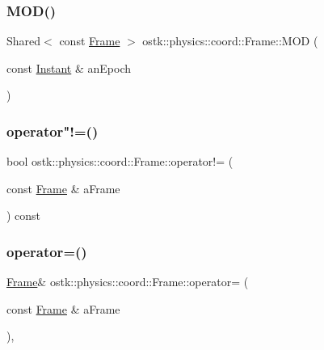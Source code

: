 \mbox{\label{classostk_1_1physics_1_1coord_1_1_frame_a3d0822a703af130adbc1f93dfd1faad9}} 
\subsubsection{\texorpdfstring{M\+O\+D()}{MOD()}}
{\footnotesize\ttfamily Shared$<$ const \hyperlink{classostk_1_1physics_1_1coord_1_1_frame}{Frame} $>$ ostk\+::physics\+::coord\+::\+Frame\+::\+M\+OD (\begin{DoxyParamCaption}\item[{const \hyperlink{classostk_1_1physics_1_1time_1_1_instant}{Instant} \&}]{an\+Epoch }\end{DoxyParamCaption})\hspace{0.3cm}{\ttfamily [static]}}

\mbox{\label{classostk_1_1physics_1_1coord_1_1_frame_a12a5cb341c34a404f220b0940a5dff79}} 
\subsubsection{\texorpdfstring{operator"!=()}{operator!=()}}
{\footnotesize\ttfamily bool ostk\+::physics\+::coord\+::\+Frame\+::operator!= (\begin{DoxyParamCaption}\item[{const \hyperlink{classostk_1_1physics_1_1coord_1_1_frame}{Frame} \&}]{a\+Frame }\end{DoxyParamCaption}) const}

\mbox{\label{classostk_1_1physics_1_1coord_1_1_frame_ac47e4fe942c8cd0b8969ee9f6d32b816}} 
\subsubsection{\texorpdfstring{operator=()}{operator=()}}
{\footnotesize\ttfamily \hyperlink{classostk_1_1physics_1_1coord_1_1_frame}{Frame}\& ostk\+::physics\+::coord\+::\+Frame\+::operator= (\begin{DoxyParamCaption}\item[{const \hyperlink{classostk_1_1physics_1_1coord_1_1_frame}{Frame} \&}]{a\+Frame }\end{DoxyParamCaption})\hspace{0.3cm}{\ttfamily [protected]}, {\ttfamily [default]}}

